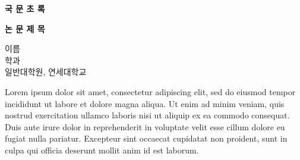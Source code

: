 \clearpage
\begin{flushleft}
    \Large{
        \textbf{국 문 초 록}\\
    }
\vspace{\baselineskip}
\end{flushleft}

\begin{centering}
    \LARGE{
        \textbf{논 문 제 목} \\
    }
\vspace{\baselineskip}
\end{centering}


\begin{flushright}
    이름 \\
    학과 \\
    일반대학원, 연세대학교
\end{flushright}

Lorem ipsum dolor sit amet, consectetur adipiscing elit, sed do eiusmod tempor incididunt ut labore et dolore magna aliqua. Ut enim ad minim veniam, quis nostrud exercitation ullamco laboris nisi ut aliquip ex ea commodo consequat. Duis aute irure dolor in reprehenderit in voluptate velit esse cillum dolore eu fugiat nulla pariatur. Excepteur sint occaecat cupidatat non proident, sunt in culpa qui officia deserunt mollit anim id est laborum.

